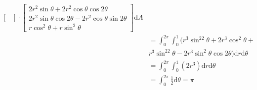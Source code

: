 \documentclass[11pt, a4paper]{article}
\begin{document}
$$\begin{aligned}
\begin{bmatrix}
    \end{bmatrix} \cdot
    \begin{bmatrix}
        2r^2\sin\theta+2r^2\cos\theta\cos2\theta \\
        2r^2\sin\theta\cos2\theta-2r^2\cos\theta\sin2\theta \\
        r\cos^2\theta+r\sin^2\theta
    \end{bmatrix} \mathrm{d}A \\
    &= \int_0^{2\pi}\int_0^1 (r^3\sin^22\theta+2r^3\cos^2\theta+\\&r^3\sin^22\theta-2r^3\sin^2\theta\cos2\theta)\mathrm{d}r\mathrm{d}\theta \\
    &= \int_0^{2\pi}\int_0^1(2r^3)\mathrm{d}r\mathrm{d}\theta \\
    &=\int_0^{2\pi}\frac{1}{2}\mathrm{d}\theta = \pi
\end{aligned}$$
\end{document}
